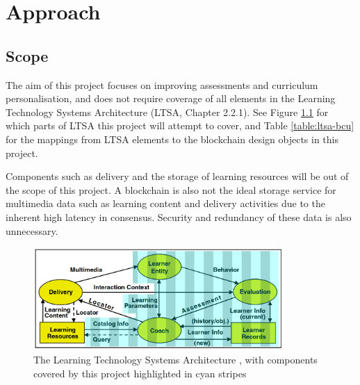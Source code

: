 \chapter{Approach}
\graphicspath{{Chapter3/Figs/Raster/}{Chapter3/Figs/}}

\section{Scope}

The aim of this project focuses on improving assessments and curriculum personalisation, and does not require 
coverage of all elements in the Learning Technology Systems Architecture (LTSA, Chapter 2.2.1). 
See Figure \ref{fig:ltsa-covered} for which parts of LTSA this project will attempt to cover, and 
Table \ref{table:ltsa-bcu} for the mappings from LTSA elements to the blockchain design objects in this project.

Components such as delivery and the storage of learning resources will be out of the scope of this project. 
A blockchain is also not the ideal storage service for multimedia data such as learning content and delivery activities 
due to the inherent high latency in consensus. Security and redundancy of these data is also unnecessary. 

\begin{figure}[!ht] 
    \centering    
    \includegraphics[width=0.85\textwidth]{ltsa-covered}
    \caption[Design Coverage of LTSA]
        {The Learning Technology Systems Architecture \citep{ieee2003ltsa}, 
        with components covered by this project highlighted in cyan stripes} 
    \label{fig:ltsa-covered}
\end{figure}

